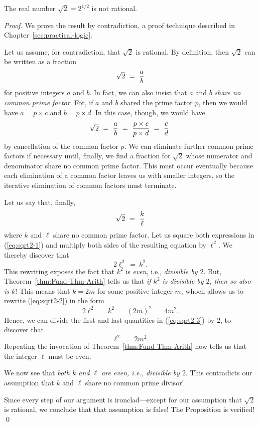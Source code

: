 
\begin{prop}
\label{thm:sqrt(2)}
The real number $\sqrt{2} = 2^{1/2}$ is not rational.
\end{prop}

\begin{proof}
We prove the result by contradiction,
a proof technique described in Chapter~\ref{sec:practical-logic}.

Let us assume, for contradiction, that $\sqrt{2}$ is rational.  By
definition, then $\sqrt{2}$ can be written as a fraction
\[ \sqrt{2} \ = \ {a \over b} \]
for positive integers $a$ and $b$.  In fact, we can also insist that
$a$ and $b$ {\em share no common prime factor}.  For, if $a$ and $b$
shared the prime factor $p$, then we would have $a = p \times c$ and
$b = p \times d$.  In this case, though, we would have
\[ \sqrt{2} \ = \ {a \over b} \ = \ \frac{p \times c}{p \times d}
\ = \ {c \over d}.
\]
by cancellation of the common factor $p$.  We can eliminate further
common prime factors if necessary until, finally, we find a fraction
for $\sqrt{2}$ whose numerator and denominator share no common prime
factor.  This must occur eventually because each elimination of a
common factor leaves us with smaller integers, so the iterative
elimination of common factors must terminate.

Let us say that, finally,
\begin{equation}
\label{eq:sqrt2-1}
\sqrt{2} \ = \ {k \over \ell}
\end{equation}
where $k$ and $\ell$ share no common prime factor.  Let us square both
expressions in (\ref{eq:sqrt2-1}) and multiply both sides of the
resulting equation by $\ell^2$.  We thereby discover that
\begin{equation}
\label{eq:sqrt2-2}
2 \ell^2 \ = \ k^2.
\end{equation}
This rewriting exposes the fact that $k^2$ is {\em even},
i.e., {\em divisible by $2$}.  But, Theorem~\ref{thm:Fund-Thm-Arith}
tells us that {\em if $k^2$ is divisible by $2$, then so also is $k$}!
This means that $k = 2m$ for some positive integer $m$, whoch allows
us to rewrite (\ref{eq:sqrt2-2}) in the form
\begin{equation}
\label{eq:sqrt2-3}
2 \ell^2 \ = \ k^2 \ = \ (2m)^2 \ = \ 4m^2.
\end{equation}
Hence, we can divide the first and last quantities in
(\ref{eq:sqrt2-3}) by $2$, to discover that
\[ \ell^2 \ = \ 2m^2. \]
Repeating the invocation of Theorem~\ref{thm:Fund-Thm-Arith} now tells
us that the integer $\ell$ must be even.

We now see that {\em both $k$ and $\ell$ are even, i.e., divisible by
  $2$}.  This contradicts our assumption that $k$ and $\ell$ share no
common prime divisor!

Since every step of our argument is ironclad---except for our
assumption that $\sqrt{2}$ is rational, we conclude that that
assumption is false!  The Proposition is verified!  \qed
\end{proof}

